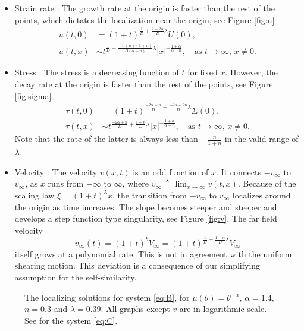 \documentclass[graybox]{svmult}
\begin{document}
\begin{itemize}
\item Strain rate : The growth rate at the origin is faster than the rest of the points, which dictates the localization near the origin, see Figure \ref{fig:u}
\begin{align*}
 u(t,0) &= (1+t)^{\frac{1}{D} + \frac{2+2\alpha}{D}\lambda}U(0), \\
 u(t,x) &\sim t^{\frac{1}{D} - \frac{(1+\alpha)(1+n)}{D(\alpha-n)}\lambda}|x|^{-\frac{1+\alpha}{\alpha-n}}, \quad \text{as $t \rightarrow \infty$, $x\ne0$.}
\end{align*}
\item Stress : The stress is a decreasing function of $t$ for  fixed $x$. However, the decay rate at the origin is faster than the rest of the points, see Figure \ref{fig:sigma}
\begin{align*}
 \tau(t,0) &= (1+t)^{\frac{-2\alpha+n}{D} + \frac{-2\alpha+2n}{D}\lambda}\Sigma(0), \\
 \tau(t,x) &\sim t^{\frac{-2\alpha+n}{D} +\frac{1+n}{D}\lambda}|x|^{-\frac{1+\alpha}{\alpha-n}}, \quad \text{as $t \rightarrow \infty$, $x\ne0$.}
\end{align*}
Note that the rate of the latter is always less than $-\frac{n}{1+n}$ in the valid range of  $\lambda$.
\item Velocity : The velocity $v(x,t)$ is an odd function of $x$. It connects $-v_\infty$ to $v_\infty$, as $x$ runs from $-\infty$ to $\infty$, where $v_\infty\triangleq \lim_{x \rightarrow \infty} v(t,x)$. Because of the scaling law $\xi=(1+t)^\lambda x$, the transition from $-v_\infty$ to $v_\infty$ localizes around the origin as time increases. The slope becomes steeper and steeper and develops a step function type singularity, see Figure \ref{fig:v}. The far field velocity 
$$v_\infty(t)=(1+t)^{b}V_\infty = (1+t)^{\frac{1}{D} + \frac{1+n}{D}\lambda}V_\infty$$
itself grows at a polynomial rate. This is not in agreement with the uniform shearing motion. This deviation is a consequence of our simplifying assumption for the self-similarity.
\end{itemize}

\begin{figure}[ht]
  \centering
\caption{The localizing solutions for system \eqref{eq:B}, for $\mu(\theta)=\theta^{-\alpha}$, $\alpha=1.4$, $n=0.3$ and $\lambda =0.39$. 
 All graphs except $v$ are in logarithmic scale. See \cite{KLT_2016} for the system \eqref{eq:C}.} 
\end{figure}
\end{document}
